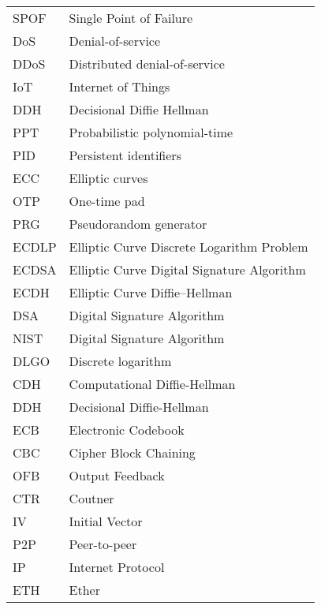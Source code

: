\begin{center}
\begin{longtable}{ l @{\qquad} l }
	SPOF    & Single Point of Failure \\
	DoS    & Denial-of-service \\
	DDoS    & Distributed denial-of-service \\
	IoT    & Internet of Things \\
	DDH    & Decisional Diffie Hellman \\
	PPT    & Probabilistic polynomial-time \\
	PID    & Persistent identifiers \\
	ECC    & Elliptic curves \\
	OTP    & One-time pad\\
	PRG    & Pseudorandom generator\\
	ECDLP    & Elliptic Curve Discrete Logarithm Problem\\
	ECDSA    & Elliptic Curve Digital Signature Algorithm\\
	ECDH    & Elliptic Curve Diffie–Hellman\\
	DSA    & Digital Signature Algorithm\\
	NIST    & Digital Signature Algorithm\\
	DLGO    & Discrete logarithm\\
	CDH    & Computational Diffie-Hellman\\
	DDH    & Decisional Diffie-Hellman\\
	ECB    & Electronic Codebook\\
	CBC    & Cipher Block Chaining\\
	OFB    & Output Feedback\\
	CTR    & Coutner\\
	IV    & Initial Vector\\
	P2P    & Peer-to-peer\\
	IP    & Internet Protocol\\
	ETH    & Ether\\
	\bottomrule
	\end{longtable}
\end{center}
